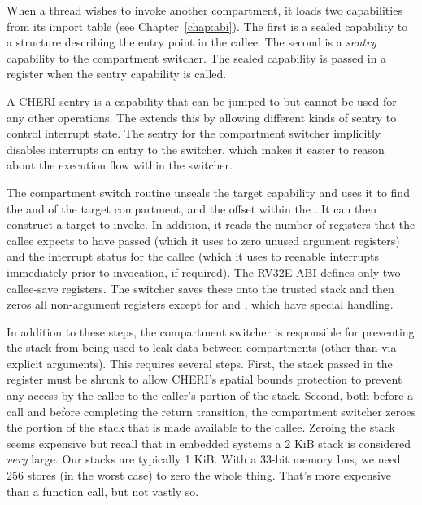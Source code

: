 When a thread wishes to invoke another compartment, it loads two capabilities from its import table (see Chapter~\ref{chap:abi}).
The first is a sealed capability to a structure describing the entry point in the callee.
The second is a \textit{sentry} capability to the compartment switcher.
The sealed capability is passed in a register when the sentry capability is called.

A CHERI sentry is a capability that can be jumped to but cannot be used for any other operations.
The \cherimcuisa{} extends this by allowing different kinds of sentry to control interrupt state.
The sentry for the compartment switcher implicitly disables interrupts on entry to the switcher, which makes it easier to reason about the execution flow within the switcher.

The compartment switch routine unseals the target capability and uses it to find the \PCC{} and \CGP{} of the target compartment, and the offset within the \PCC{}.
It can then construct a target to invoke.
In addition, it reads the number of registers that the callee expects to have passed (which it uses to zero unused argument registers) and the interrupt status for the callee (which it uses to reenable interrupts immediately prior to invocation, if required).
The RV32E ABI defines only two callee-save registers.
The switcher saves these onto the trusted stack and then zeros all non-argument registers except for \CGP{}  and \CSP{}, which have special handling.

In addition to these steps, the compartment switcher is responsible for preventing the stack from being used to leak data between compartments (other than via explicit arguments).
This requires several steps.
First, the stack passed in the \CSP{} register must be shrunk to allow CHERI's spatial bounds protection to prevent any access by the callee to the caller's portion of the stack.
Second, both before a call and before completing the return transition, the compartment switcher zeroes the portion of the stack that is made available to the callee.
Zeroing the stack seems expensive but recall that in embedded systems a 2 KiB stack is considered \textit{very} large.
Our stacks are typically 1 KiB.
With a 33-bit memory bus, we need 256 stores (in the worst case) to zero the whole thing.
That's more expensive than a function call, but not vastly so.

